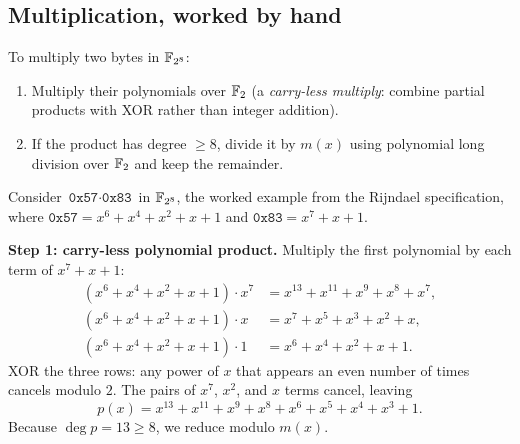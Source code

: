 \subsection{Multiplication, worked by hand}

To multiply two bytes in $\mathbb{F}_{2^8}$:
\begin{enumerate}
  \item Multiply their polynomials over $\mathbb{F}_2$ (a \emph{carry-less multiply}:
        combine partial products with XOR rather than integer addition).
  \item If the product has degree $\geq 8$, divide it by $m(x)$ using
        polynomial long division over $\mathbb{F}_2$ and keep the remainder.
\end{enumerate}

Consider $\texttt{0x57} \cdot \texttt{0x83}$ in $\mathbb{F}_{2^8}$, the worked example
from the Rijndael specification, where $\texttt{0x57} = x^6 + x^4 + x^2 + x + 1$
and $\texttt{0x83} = x^7 + x + 1$.

\textbf{Step 1: carry-less polynomial product.} Multiply the first polynomial
by each term of $x^7 + x + 1$:
\begin{align*}
(x^6+x^4+x^2+x+1)\cdot x^7
  &= x^{13}+x^{11}+x^{9}+x^{8}+x^{7},\\
(x^6+x^4+x^2+x+1)\cdot x
  &= x^{7}+x^{5}+x^{3}+x^{2}+x,\\
(x^6+x^4+x^2+x+1)\cdot 1
  &= x^{6}+x^{4}+x^{2}+x+1.
\end{align*}
XOR the three rows: any power of $x$ that appears an even number of times
cancels modulo $2$. The pairs of $x^7$, $x^2$, and $x$ terms cancel, leaving
\[
p(x) = x^{13}+x^{11}+x^{9}+x^{8}+x^{6}+x^{5}+x^{4}+x^{3}+1.
\]
Because $\deg p = 13 \ge 8$, we reduce modulo $m(x)$.


